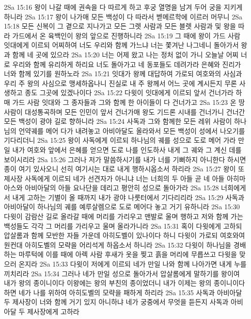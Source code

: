 2Sa 15:16  왕이 나갈 때에 권속을 다 따르게 하고 후궁 열명을 남겨 두어 궁을 지키게 하니라
2Sa 15:17  왕이 나가매 모든 백성이 다 따라서 벧메르학에 이르러 머무니
2Sa 15:18  모든 신복이 그 곁으로 지나가고 모든 그렛 사람과 모든 블렛 사람과 및 왕을 따라 가드에서 온 육백인이 왕의 앞으로 진행하니라
2Sa 15:19  그 때에 왕이 가드 사람 잇대에게 이르되 어찌하여 너도 우리와 함께 가느냐 너는 쫓겨난 나그네니 돌아가서 왕과 함께 네 곳에 있으라
2Sa 15:20  너는 어제 왔고 나는 정처 없이 가니 오늘날 어찌 너로 우리와 함께 유리하게 하리요 너도 돌아가고 네 동포들도 데려가라 은혜와 진리가 너와 함께 있기를 원하노라
2Sa 15:21  잇대가 왕께 대답하여 가로되 여호와의 사심과 우리 주 왕의 사심으로 맹세하옵나니 진실로 내 주 왕께서 어느 곳에 계시든지 무론 사생하고 종도 그곳에 있겠나이다
2Sa 15:22  다윗이 잇대에게 이르되 앞서 건너가라 하매 가드 사람 잇대와 그 종자들과 그와 함께 한 아이들이 다 건너가고
2Sa 15:23  온 땅 사람이 대성통곡하며 모든 인민이 앞서 건너가매 왕도 기드론 시내를 건너가니 건너간 모든 백성이 광야 길로 향하니라
2Sa 15:24  사독과 그와 함께한 모든 레위 사람이 하나님의 언약궤를 메어 다가 내려놓고 아비아달도 올라와서 모든 백성이 성에서 나오기를 기다리더니
2Sa 15:25  왕이 사독에게 이르되 하나님의 궤를 성으로 도로 메어 가라 만일 내가 여호와 앞에서 은혜를 얻으면 도로 나를 인도하사 내게 그 궤와 그 계신 데를 보이시리라
2Sa 15:26  그러나 저가 말씀하시기를 내가 너를 기뻐하지 아니한다 하시면 종이 여기 있사오니 선히 여기시는 대로 내게 행하시옵소서 하리라
2Sa 15:27  왕이 또 제사장 사독에게 이르되 네가 선견자가 아니냐 너는 너희의 두 아들 곧 네 아들 아히마아스와 아비아달의 아들 요나단을 데리고 평안히 성으로 돌아가라
2Sa 15:28  너희에게서 내게 고하는 기별이 올 때까지 내가 광야 나룻터에서 기다리리라
2Sa 15:29  사독과 아비아달이 하나님의 궤를 예루살렘으로 도로 메어다 놓고 거기 유하니라
2Sa 15:30  다윗이 감람산 길로 올라갈 때에 머리를 가리우고 맨발로 울며 행하고 저와 함께 가는 백성들도 각각 그 머리를 가리우고 울며 올라가니라
2Sa 15:31  혹이 다윗에게 고하되 압살롬과 함께 모반한 자들 가운데 아히도벨이 있나이다 하니 다윗이 가로되 여호와여 원컨대 아히도벨의 모략을 어리석게 하옵소서 하니라
2Sa 15:32  다윗이 하나님을 경배하는 마루턱에 이를 때에 아렉 사람 후새가 옷을 찢고 흙을 머리에 무릅쓰고 다윗을 맞으러 온지라
2Sa 15:33  다윗이 저에게 이르되 네가 만일 나와 함께 나아가면 내게 누를 끼치리라
2Sa 15:34  그러나 네가 만일 성으로 돌아가서 압살롬에게 말하기를 왕이여 내가 왕의 종이니이다 이왕에는 왕의 부친의 종이었더니 내가 이제는 왕의 종이니이다 하면 네가 나를 위하여 아히도벨의 모략을 패하게 하리라
2Sa 15:35  사독과 아비아달 두 제사장이 너와 함께 거기 있지 아니하냐 네가 궁중에서 무엇을 듣든지 사독과 아비아달 두 제사장에게 고하라
